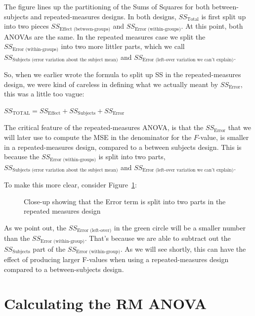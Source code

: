 \documentclass[
  letterpaper,
  DIV=11,
  numbers=noendperiod]{scrreprt}
\begin{document}
The figure lines up the partitioning of the Sums of Squares for both
between-subjects and repeated-measures designs. In both designs,
\(SS_\text{Total}\) is first split up into two pieces
\(SS_\text{Effect (between-groups)}\) and
\(SS_\text{Error (within-groups)}\). At this point, both ANOVAs are the
same. In the repeated measures case we split the
\(SS_\text{Error (within-groups)}\) into two more littler parts, which
we call \(SS_\text{Subjects (error variation about the subject mean)}\)
and \(SS_\text{Error (left-over variation we can't explain)}\).

So, when we earlier wrote the formula to split up SS in the
repeated-measures design, we were kind of careless in defining what we
actually meant by \(SS_\text{Error}\), this was a little too vague:

\(SS_\text{TOTAL} = SS_\text{Effect} + SS_\text{Subjects} +SS_\text{Error}\)

The critical feature of the repeated-measures ANOVA, is that the
\(SS_\text{Error}\) that we will later use to compute the MSE in the
denominator for the \(F\)-value, is smaller in a repeated-measures
design, compared to a between subjects design. This is because the
\(SS_\text{Error (within-groups)}\) is split into two parts,
\(SS_\text{Subjects (error variation about the subject mean)}\) and
\(SS_\text{Error (left-over variation we can't explain)}\).

To make this more clear, consider Figure~\ref{fig-9moresplit}:

\begin{figure}


\caption{\label{fig-9moresplit}Close-up showing that the Error term is
split into two parts in the repeated measures design}

\end{figure}%

As we point out, the \(SS_\text{Error (left-over)}\) in the green circle
will be a smaller number than the \(SS_\text{Error (within-group)}\).
That's because we are able to subtract out the \(SS_\text{Subjects}\)
part of the \(SS_\text{Error (within-group)}\). As we will see shortly,
this can have the effect of producing larger F-values when using a
repeated-measures design compared to a between-subjects design.

\section{Calculating the RM ANOVA}\label{calculating-the-rm-anova}
\end{document}
